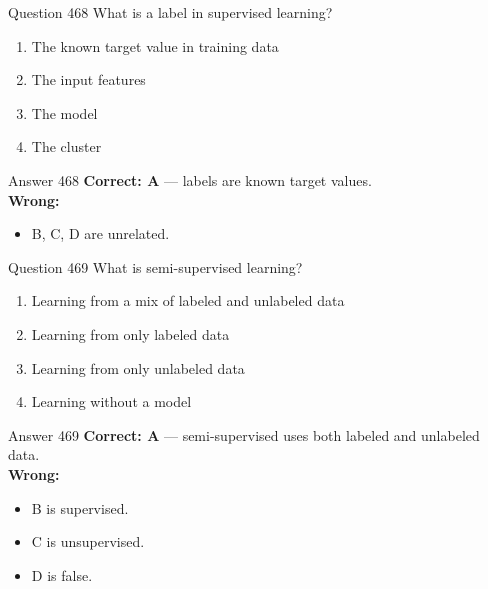\documentclass[aspectratio=169,11pt]{beamer}
\begin{document}
	\begin{frame}{Question 468}
		What is a label in supervised learning?
		\begin{enumerate}[label=\Alph*.]
			\item The known target value in training data
			\item The input features
			\item The model
			\item The cluster
		\end{enumerate}
	\end{frame}
	\begin{frame}{Answer 468}
		\textbf{Correct: A} --- labels are known target values.\\
		\vspace{0.5em}
		\textbf{Wrong:}
		\begin{itemize}
			\item B, C, D are unrelated.
		\end{itemize}
	\end{frame}
	
	\begin{frame}{Question 469}
		What is semi-supervised learning?
		\begin{enumerate}[label=\Alph*.]
			\item Learning from a mix of labeled and unlabeled data
			\item Learning from only labeled data
			\item Learning from only unlabeled data
			\item Learning without a model
		\end{enumerate}
	\end{frame}
	\begin{frame}{Answer 469}
		\textbf{Correct: A} --- semi-supervised uses both labeled and unlabeled data.\\
		\vspace{0.5em}
		\textbf{Wrong:}
		\begin{itemize}
			\item B is supervised.
			\item C is unsupervised.
			\item D is false.
		\end{itemize}
	\end{frame}
	
\end{document}
